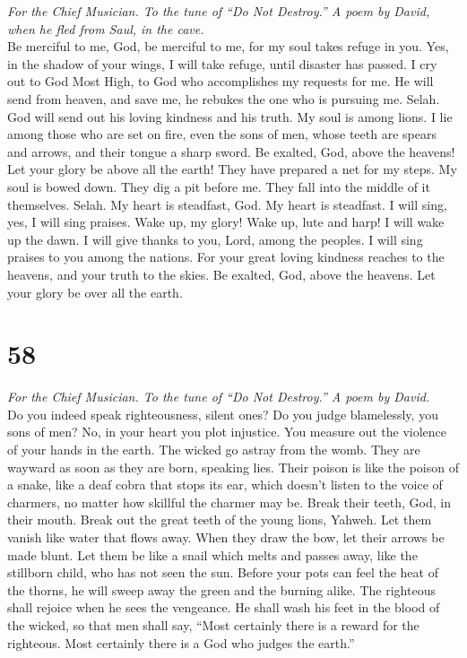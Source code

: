 \emph{For the Chief Musician. To the tune of ``Do Not Destroy.'' A poem
by David, when he fled from Saul, in the cave.}\\
 Be merciful to me, God, be merciful to me, for my soul
takes refuge in you. Yes, in the shadow of your wings, I will take
refuge, until disaster has passed.  I cry out to God Most
High, to God who accomplishes my requests for me.  He will
send from heaven, and save me, he rebukes the one who is pursuing me.
Selah. God will send out his loving kindness and his truth.
 My soul is among lions. I lie among those who are set on
fire, even the sons of men, whose teeth are spears and arrows, and their
tongue a sharp sword.  Be exalted, God, above the heavens!
Let your glory be above all the earth!  They have prepared
a net for my steps. My soul is bowed down. They dig a pit before me.
They fall into the middle of it themselves. Selah.  My
heart is steadfast, God. My heart is steadfast. I will sing, yes, I will
sing praises.  Wake up, my glory! Wake up, lute and harp!
I will wake up the dawn.  I will give thanks to you, Lord,
among the peoples. I will sing praises to you among the nations.
 For your great loving kindness reaches to the heavens,
and your truth to the skies.  Be exalted, God, above the
heavens. Let your glory be over all the earth.

\hypertarget{section-57}{%
\section{58}\label{section-57}}

\emph{For the Chief Musician. To the tune of ``Do Not Destroy.'' A poem
by David.}\\
 Do you indeed speak righteousness, silent ones? Do you
judge blamelessly, you sons of men?  No, in your heart you
plot injustice. You measure out the violence of your hands in the earth.
 The wicked go astray from the womb. They are wayward as
soon as they are born, speaking lies.  Their poison is
like the poison of a snake, like a deaf cobra that stops its ear,
 which doesn't listen to the voice of charmers, no matter
how skillful the charmer may be.  Break their teeth, God,
in their mouth. Break out the great teeth of the young lions, Yahweh.
 Let them vanish like water that flows away. When they
draw the bow, let their arrows be made blunt.  Let them be
like a snail which melts and passes away, like the stillborn child, who
has not seen the sun.  Before your pots can feel the heat
of the thorns, he will sweep away the green and the burning alike.
 The righteous shall rejoice when he sees the vengeance.
He shall wash his feet in the blood of the wicked,  so
that men shall say, ``Most certainly there is a reward for the
righteous. Most certainly there is a God who judges the earth.''

